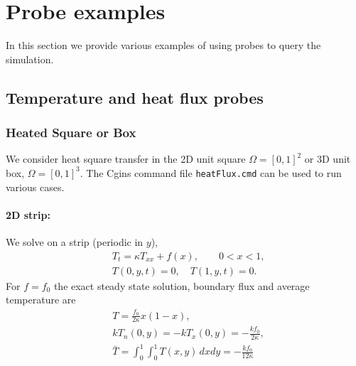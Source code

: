 %
\section{Probe examples} \label{sec:probeExamples}


In this section we provide various examples of using probes
to query the simulation.



\subsection{Temperature and heat flux probes}

\newcommand{\kThermal}{\mathcal{K}}
\subsubsection{Heated Square or Box}

We consider heat square transfer in the 2D unit square $\Omega=[0,1]^2$ or 3D unit box, $\Omega=[0,1]^3$. 
The Cgins command file {\tt heatFlux.cmd} can be used to run various cases.


\paragraph{2D strip:} We solve on a strip (periodic in $y$), 
\begin{align}
 &   T_t = \kappa T_{xx} + f(x), \qquad 0<x<1, \\
 &   T(0,y,t)=0, \quad T(1,y,t)=0.
\end{align}
For $f=f_0$ the exact steady state solution, boundary flux and average temperature are
\begin{align}
&   T = \frac{f_0}{2\kappa} x (1-x) , \\
&  k T_n(0,y)= -k T_x(0,y) =  -\frac{k f_0}{2\kappa}, \\
&  \bar{T} = \int_0^1\int_0^1 T(x,y) \, dx dy = -\frac{k f_0}{12\kappa}
\end{align}


